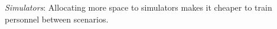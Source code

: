 \emph{Simulators}: Allocating more space to simulators makes it cheaper to train personnel between scenarios.
